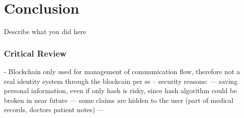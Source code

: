 \chapter{Conclusion}
\label{cha:conclusion}

Describe what you did here

\subsection{Critical Review}

- Blockchain only used for management of communication flow, therefore not a real identity system through the blockcain per se
-- security reasons:
--- saving personal information, even if only hash is risky, since hash algorithm could be broken in near future
--- some claims are hidden to the user (part of medical records, doctors patient notes)
--- 
